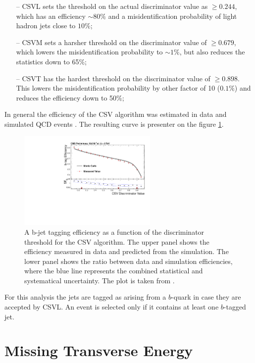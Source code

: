 \begin{itemize}
 \item [--] CSVL sets the threshold on the actual discriminator value as $\geq 0.244$, which has an efficiency $\sim 80\%$ and a misidentification probability of
 light hadron jets close to $10\%$;
 \item [--] CSVM sets a harsher threshold on the discriminator value of $\geq 0.679$, which lowers the misidentification probability to $\sim 1\%$, but also
 reduces the statistics down to 65$\%$;
 \item [--] CSVT has the hardest threshold on the discriminator value of $\geq 0.898$. This lowers the misidentification probability by other factor of 10 ($0.1\%$)
 and reduces the efficiency down to 50$\%$;
\end{itemize}

In general the efficiency of the CSV algorithm was estimated in data and simulated QCD events \cite{CMS-PAS-BTV-13-001}. The resulting curve is presenter on the figure \ref{fig:CSVeff}.

\begin{figure}[t]
  \centering
  \includegraphics[width=0.6\textwidth]{04_event_reconstruction/plots/Figure_012-b.pdf}
  \caption{A b-jet tagging efficiency as a function of the discriminator threshold for the CSV algorithm. The upper panel shows the efficiency measured in data and predicted from the simulation.
  The lower panel shows the ratio between data and simulation efficiencies, where the blue line represents the combined statistical and systematical uncertainty. The plot is taken from \cite{CMS-PAS-BTV-13-001}.}
  \label{fig:CSVeff}
\end{figure}

For this analysis the jets are tagged as arising from a $b$-quark in case they are accepted by CSVL. An event is selected only if it contains at least one $b$-tagged jet.

\section{Missing Transverse Energy}

